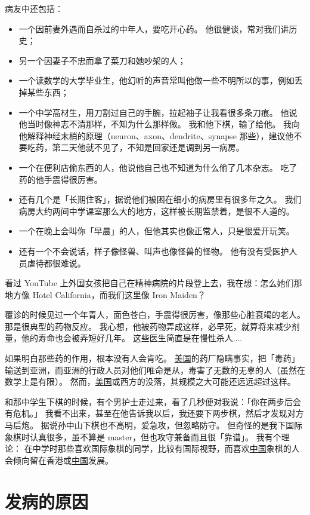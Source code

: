 \documentclass[12pt]{report}
\begin{document}
病友中还包括：
\begin{itemize}
\item 一个因前妻外遇而自杀过的中年人，要吃开心药。 他很健谈，常对我们讲历史；
\item 另一个因妻子不忠而拿了菜刀和她吵架的人；
\item 一个读数学的大学毕业生，他幻听的声音常叫他做一些不明所以的事，例如丢掉某些东西；
\item 一个中学高材生，用刀割过自己的手腕，拉起袖子让我看很多条刀痕。 他说他当时像神志不清那样，不知为什么那样做。 我和他下棋，输了给他。 我向他解释神经末梢的原理（neuron、axon、dendrite、synapse 那些），建议他不要吃药，第二天他就不见了，不知是回家还是调到另一病房。
\item 一个在便利店偷东西的人，他说他自己也不知道为什么偷了几本杂志。 吃了药的他手震得很厉害。
\item 还有几个是「长期住客」，据说他们被困在细小的病房里有很多年之久。 我们病房大约两间中学课室那么大的地方，这样被长期监禁着，是很不人道的。
\item 一个在晚上会叫你「早晨」的人，但他其实也像正常人，只是很爱开玩笑。
\item 还有一个不会说话，样子像怪兽、叫声也像怪兽的怪物。 他有没有受医护人员虐待都很难说。
\end{itemize}

看过 YouTube 上外国女孩把自己在精神病院的片段登上去，我在想：怎么她们那地方像 Hotel California，而我们这里像 Iron Maiden？

覆诊的时候见过一个年青人，面色苍白，手震得很厉害，像那些心脏衰竭的老人。 那是很典型的药物反应。 我心想，他被药物弄成这样，必早死，就算将来减少剂量，他的寿命也会被弄短好几年。 这些医生简直是在慢性杀人....

如果明白那些药的作用，根本没有人会肯吃。 \underline{美国}的药厂隐瞒事实，把「毒药」输送到亚洲，而亚洲的行政人员对他们唯命是从，毒害了无数的无辜的人（虽然在数学上是有限）。 然而，\underline{美国}或西方的没落，其规模之大可能还远远超过这样。

和那中学生下棋的时候，有个男护士走过来，看了几秒便对我说：「你在两步后会有危机。」 我看不出来，甚至在他告诉我以后，我还要下两步棋，然后才发现对方马后炮。 据说孙中山下棋也不高明，爱急攻，但忽略防守。 但奇怪的是我下国际象棋时认真很多，虽不算是 master，但也攻守兼备而且很「靠谱」。 我有个理论： 在中学时那些喜欢国际象棋的同学，比较有国际视野，而喜欢\underline{中国}象棋的人会倾向留在香港或\underline{中国}发展。

\chapter{发病的原因}
\label{cause-of-illness}
\end{document}
